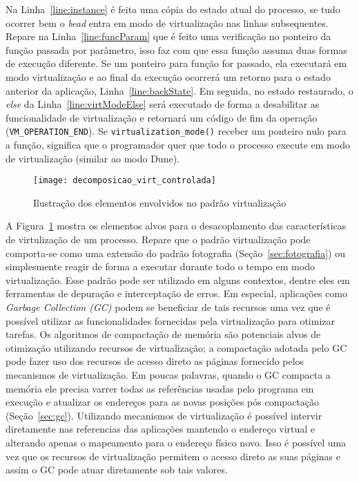 Na Linha~\ref{line:instance} é feita uma cópia do estado atual do processo, se
tudo ocorrer bem o \emph{bead} entra em modo de virtualização nas linhas
subsequentes. Repare na Linha~\ref{line:funcParam} que é feito uma verificação
no ponteiro da função passada por parâmetro, isso faz com que essa função
assuma duas formas de execução diferente. Se um ponteiro para função for
passado, ela executará em modo virtualização e ao final da execução ocorrerá um
retorno para o estado anterior da aplicação, Linha~\ref{line:backState}. Em
seguida, no estado restaurado, o \emph{else} da Linha~\ref{line:virtModeElse}
será executado de forma a desabilitar as funcionalidade de virtualização e
retornará um código de fim da operação (\texttt{VM\_OPERATION\_END}). Se
\texttt{virtualization\_mode()} receber um ponteiro nulo para a função,
significa que o programador quer que todo o processo execute em modo de
virtualização (similar ao modo Dune).

\begin{figure}[!h]
  \centering
  \texttt{[image: decomposicao\_virt\_controlada]}
  \caption{Ilustração dos elementos envolvidos no padrão virtualização}
  \label{fig:decomposicao_virt}
\end{figure}

A Figura~\ref{fig:decomposicao_virt} mostra os elementos alvos para o
desacoplamento das características de virtulização de um processo. Repare que o
padrão virtualização pode comporta-se como uma extensão do padrão fotografia
(Seção~\ref{sec:fotografia}) ou simplesmente reagir de forma a executar durante
todo o tempo em modo virtualização. Esse padrão pode ser utilizado em alguns
contextos, dentre eles em ferramentas de depuração e interceptação de erros. Em
especial, aplicações como \emph{Garbage Collection (GC)} podem se beneficiar de
tais recursos uma vez que é possível utilizar as funcionalidades fornecidas
pela virtualização para otimizar tarefas. Os algoritmos de compactação de
memória são potenciais alvos de otimização utilizando recursos de
virtualização; a compactação adotada pelo GC pode fazer uso dos recursos de
acesso direto as páginas fornecido pelos mecanismos de virtualização. Em poucas
palavras, quando o GC compacta a memória ele precisa varrer todas as
referências usadas pelo programa em execução e atualizar os endereços para as
novas posições pós compactação (Seção~\ref{sec:gc}). Utilizando mecanismos de
virtualização é possível intervir diretamente nas referencias das aplicações
mantendo o endereço virtual e alterando apenas o mapeamento para o endereço
físico novo. Isso é possível uma vez que os recursos de virtualização permitem o
acesso direto as suas páginas e assim o GC pode atuar diretamente sob tais
valores. 

